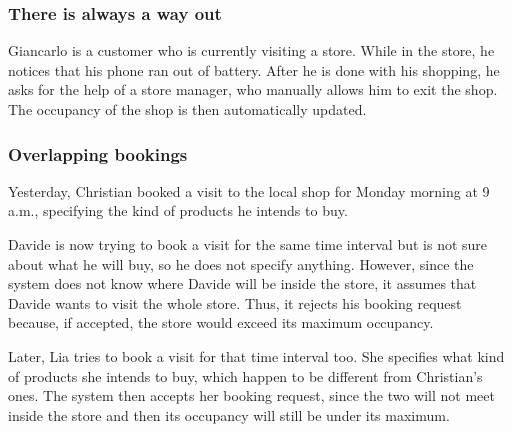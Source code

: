 \documentclass[a4paper,oneside,11pt]{book}   %
\begin{document}
        \subsubsection{There is always a way out}
        Giancarlo is a customer who is currently visiting a store. While in the store, he notices that his phone ran out of battery. After he is done with his shopping, he asks for the help of a store manager, who manually allows him to exit the shop. The occupancy of the shop is then automatically updated.
        \subsubsection{Overlapping bookings}
        Yesterday, Christian booked a visit to the local shop for Monday morning at 9 a.m., specifying the kind of products he intends to buy. \par
        Davide is now trying to book a visit for the same time interval but is not sure about what he will buy, so he does not specify anything. However, since the system does not know where Davide will be inside the store, it assumes that Davide wants to visit the whole store. Thus, it rejects his booking request because, if accepted, the store would exceed its maximum occupancy. \par
        Later, Lia tries to book a visit for that time interval too. She specifies what kind of products she intends to buy, which happen to be different from Christian’s ones. The system then accepts her booking request, since the two will not meet inside the store and then its occupancy will still be under its maximum.
    
\end{document}
